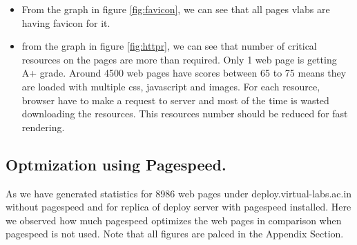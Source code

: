 \documentclass[conference]{IEEEtran}
\begin{document}
\begin{itemize}
\item From the graph in figure \ref{fig:favicon}, we can see that all pages vlabs are having favicon for it.

\item from the graph in figure \ref{fig:httpr}, we can see that number of critical resources on the pages
are more than required. Only 1 web page is getting A+ grade. Around 4500 web pages
have scores between 65 to 75 means they are loaded with multiple css, javascript
and images. For each resource, browser have to make a request to server and most
of the time is wasted downloading the resources. This resources  number should be
reduced for fast rendering.
\end{itemize}


\subsection{Optmization using Pagespeed.}\label{sec-6.2}
As we have generated statistics for 8986 web pages under
deploy.virtual-labs.ac.in without pagespeed and for replica of deploy server with pagespeed
installed. Here we observed how much pagespeed optimizes the web pages in comparison
when pagespeed is not used. Note that all figures are palced in the Appendix Section.
\end{document}
